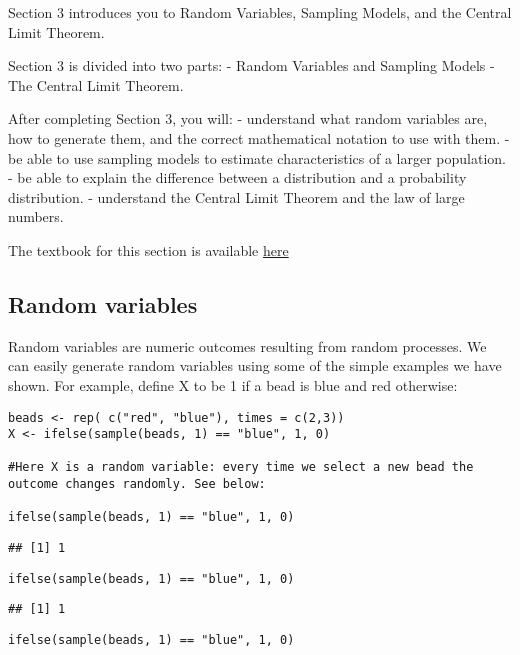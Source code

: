 \documentclass[
]{article}
\begin{document}
Section 3 introduces you to Random Variables, Sampling Models, and the
Central Limit Theorem.

Section 3 is divided into two parts: - Random Variables and Sampling
Models - The Central Limit Theorem.

After completing Section 3, you will: - understand what random variables
are, how to generate them, and the correct mathematical notation to use
with them. - be able to use sampling models to estimate characteristics
of a larger population. - be able to explain the difference between a
distribution and a probability distribution. - understand the Central
Limit Theorem and the law of large numbers.

The textbook for this section is available
\href{https://rafalab.github.io/dsbook/random-variables.html}{here}

\hypertarget{random-variables}{%
\subsection{Random variables}\label{random-variables}}

Random variables are numeric outcomes resulting from random processes.
We can easily generate random variables using some of the simple
examples we have shown. For example, define X to be 1 if a bead is blue
and red otherwise:

\begin{verbatim}
beads <- rep( c("red", "blue"), times = c(2,3))
X <- ifelse(sample(beads, 1) == "blue", 1, 0)

#Here X is a random variable: every time we select a new bead the outcome changes randomly. See below:

ifelse(sample(beads, 1) == "blue", 1, 0)
\end{verbatim}

\begin{verbatim}
## [1] 1
\end{verbatim}

\begin{verbatim}
ifelse(sample(beads, 1) == "blue", 1, 0)
\end{verbatim}

\begin{verbatim}
## [1] 1
\end{verbatim}

\begin{verbatim}
ifelse(sample(beads, 1) == "blue", 1, 0)
\end{verbatim}
\end{document}
